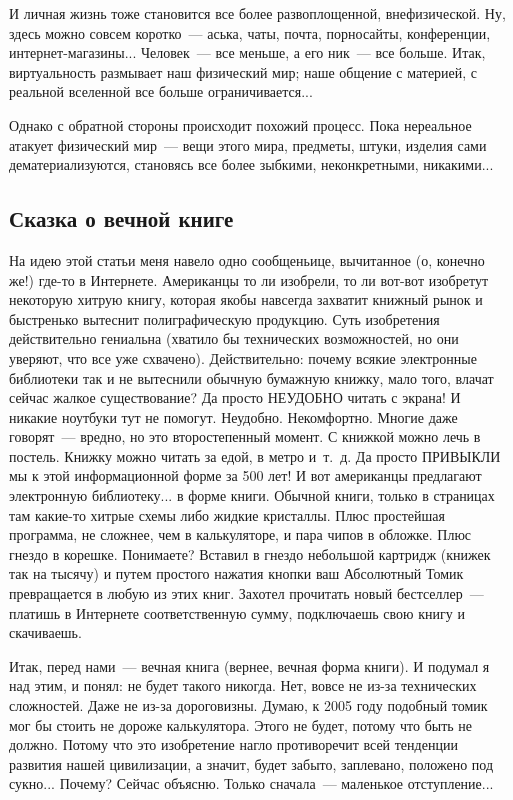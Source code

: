 \documentclass{scrbook}
\newcommand{\mdash}{~--- }
\newcommand{\essaysection}[1]{\subsection*{#1}\nopagebreak}
\begin{document}
И личная жизнь тоже становится все более развоплощенной, внефизической. Ну, здесь можно совсем коротко{\mdash}аська, чаты, почта, порносайты, конференции, интернет-магазины... Человек{\mdash}все меньше, а его ник{\mdash}все больше. Итак, виртуальность размывает наш физический мир; наше общение с материей, с реальной вселенной все больше ограничивается...

Однако с обратной стороны происходит похожий процесс. Пока нереальное атакует физический мир{\mdash}вещи этого мира, предметы, штуки, изделия сами дематериализуются, становясь все более зыбкими, неконкретными, никакими...

\essaysection{Сказка о вечной книге}

На идею этой статьи меня навело одно сообщеньице, вычитанное (о, конечно же!) где-то в Интернете. Американцы то ли изобрели, то ли вот-вот изобретут некоторую хитрую книгу, которая якобы навсегда захватит книжный рынок и быстренько вытеснит полиграфическую продукцию. Суть изобретения действительно гениальна (хватило бы технических возможностей, но они уверяют, что все уже схвачено). Действительно: почему всякие электронные библиотеки так и не вытеснили обычную бумажную книжку, мало того, влачат сейчас жалкое существование? Да просто НЕУДОБНО читать с экрана! И никакие ноутбуки тут не помогут. Неудобно. Некомфортно. Многие даже говорят{\mdash}вредно, но это второстепенный момент. С книжкой можно лечь в постель. Книжку можно читать за едой, в метро и~т.~д. Да просто ПРИВЫКЛИ мы к этой информационной форме за 500 лет! И вот американцы предлагают электронную библиотеку... в форме книги. Обычной книги, только в страницах там какие-то хитрые схемы либо жидкие кристаллы. Плюс простейшая программа, не сложнее, чем в калькуляторе, и пара чипов в обложке. Плюс гнездо в корешке. Понимаете? Вставил в гнездо небольшой картридж (книжек так на тысячу) и путем простого нажатия кнопки ваш Абсолютный Томик превращается в любую из этих книг. Захотел прочитать новый бестселлер{\mdash}платишь в Интернете соответственную сумму, подключаешь свою книгу и скачиваешь.

Итак, перед нами{\mdash}вечная книга (вернее, вечная форма книги). И подумал я над этим, и понял: не будет такого никогда. Нет, вовсе не из-за технических сложностей. Даже не из-за дороговизны. Думаю, к 2005 году подобный томик мог бы стоить не дороже калькулятора. Этого не будет, потому что быть не должно. Потому что это изобретение нагло противоречит всей тенденции развития нашей цивилизации, а значит, будет забыто, заплевано, положено под сукно... Почему? Сейчас объясню. Только сначала{\mdash}маленькое отступление...
\end{document}
